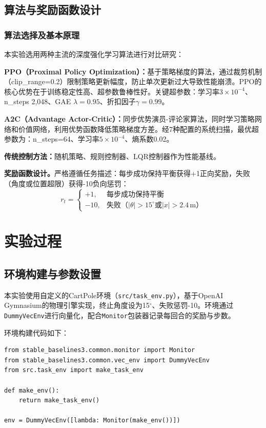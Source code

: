 \documentclass[12pt,a4paper]{ctexart}
\begin{document}
\subsection{算法与奖励函数设计}

\subsubsection{算法选择及基本原理}

本实验选用两种主流的深度强化学习算法进行对比研究：

\textbf{PPO（Proximal Policy Optimization）：}基于策略梯度的算法，通过裁剪机制（clip\_range=0.2）限制策略更新幅度，防止单次更新过大导致性能崩溃。PPO的核心优势在于训练稳定性高、超参数鲁棒性好。关键超参数：学习率\(3\times10^{-4}\)、n\_steps 2,048、GAE \(\lambda=0.95\)、折扣因子\(\gamma=0.99\)。

\textbf{A2C（Advantage Actor-Critic）：}同步优势演员-评论家算法，同时学习策略网络和价值网络，利用优势函数降低策略梯度方差。经7种配置的系统扫描，最优超参数为：n\_steps=64、学习率\(5\times10^{-4}\)、熵系数0.02。

\textbf{传统控制方法：}随机策略、规则控制器、LQR控制器作为性能基线。

\textbf{奖励函数设计。}严格遵循任务描述：每步成功保持平衡获得+1正向奖励，失败（角度或位置超限）获得-10负向惩罚：
\[
r_t = \begin{cases}
+1, & \text{每步成功保持平衡}\\
-10, & \text{失败（} |\theta| > 15^\circ \text{或} |x| > 2.4\,\text{m）}
\end{cases}
\]

\section{实验过程}

\subsection{环境构建与参数设置}

本实验使用自定义的CartPole环境（\texttt{src/task\_env.py}），基于OpenAI Gymnasium的物理引擎实现，终止角度设为15$^\circ$、失败惩罚-10。环境通过\texttt{DummyVecEnv}进行向量化，配合\texttt{Monitor}包装器记录每回合的奖励与步数。

环境构建代码如下：

\begin{verbatim}
from stable_baselines3.common.monitor import Monitor
from stable_baselines3.common.vec_env import DummyVecEnv
from src.task_env import make_task_env

def make_env():
    return make_task_env()

env = DummyVecEnv([lambda: Monitor(make_env())])
\end{verbatim}
\end{document}
